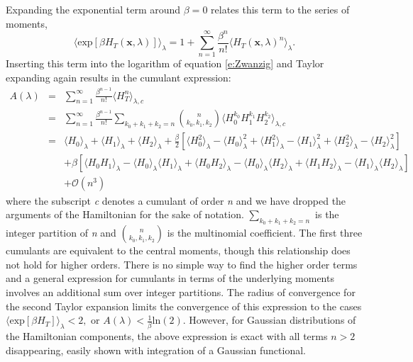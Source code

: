 \documentclass[%
 preprint,
 amsmath,amssymb,
 aps,
]{revtex4-1}
\renewcommand{\vec}[1]{{\mathbf{#1}}}
\begin{document}
Expanding the exponential term around $\beta=0$ relates this term to the series of moments,
\begin{equation}
 \langle \mbox{exp} \left[ \beta H_T (\vec{x},\lambda) \right]  \rangle_{\lambda} = 
 1+\sum_{n=1}^{\infty}  \frac{\beta^n}{n!} \langle  H_T (\vec{x},\lambda)^n \rangle_{\lambda}.
\label{e:Taylor1}
\end{equation}
Inserting this term into the logarithm of equation \ref{e:Zwanzig} and Taylor expanding again results in the cumulant 
expression:
\begin{eqnarray}
A (\lambda) &=& \sum_{n=1}^{\infty}  \frac{\beta^{n-1}}{n!} \langle  H_T^n \rangle_{\lambda,c} \\
& = &
\sum_{n=1}^{\infty}  \frac{\beta^{n-1}}{n!}  \sum_{k_0+k_1+k_2=n} 
{ n \choose k_0,k_1,k_2 } \langle  H_0^{k_0} H_1^{k_1} H_2^{k_2} \rangle_{\lambda,c} \\
& = &
\langle  H_0 \rangle_{\lambda}  + \langle  H_1 \rangle_{\lambda} + \langle  H_2 \rangle_{\lambda}  
+ \frac{\beta}{2} \left[  \langle  H_0^2 \rangle_{\lambda} -\langle  H_0 \rangle^2_{\lambda}  +
\langle  H_1^2 \rangle_{\lambda} -\langle  H_1 \rangle^2_{\lambda}  
 + \langle  H_2^2 \rangle_{\lambda} -\langle  H_2 \rangle^2_{\lambda}   \right] 
\\ 
 & & 
 + \beta \left[ \langle  H_0 H_1\rangle_{\lambda} -\langle  H_0 \rangle_{\lambda} \langle  H_1 \rangle_{\lambda} 
 +\langle  H_0 H_2\rangle_{\lambda} -\langle  H_0 \rangle_{\lambda} \langle  H_2 \rangle_{\lambda} 
 +\langle  H_1 H_2\rangle_{\lambda} -\langle  H_1 \rangle_{\lambda} \langle  H_2 \rangle_{\lambda} 
   \right]
  \\ & & 
 + \mathcal{O} (n^3)
\label{e:CumulantTot}
\end{eqnarray}
where the subscript \emph{c} denotes a cumulant of order \emph{n} and we have dropped the arguments of the Hamiltonian for the sake of notation.  $ \sum_{k_0+k_1+k_2=n} $ is the integer partition of \emph{n} and 
${ n \choose k_0,k_1,k_2 }$ is the multinomial coefficient. The first three cumulants are equivalent to the central moments, though this relationship does not hold for higher orders.  There is no simple way to find the higher order terms and a general expression for cumulants in terms of the underlying moments involves an additional sum over integer partitions.\cite{NULL}  The radius of convergence for the second Taylor expansion limits the convergence of this expression to the cases  
$
\langle \mbox{exp} \left[ \beta H_T  \right]  \rangle_{\lambda} < 2,
$
or 
$
A (\lambda) < \frac{1}{\beta}\mbox{ln} (2)
$.  However, for Gaussian distributions of the Hamiltonian components, the above expression is exact with all terms $n>2$ disappearing, easily shown with integration of a Gaussian functional. 
\end{document}

